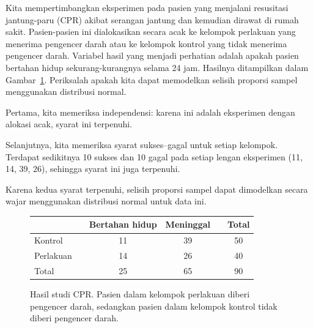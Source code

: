 \begin{examplewrap}
\begin{nexample}{Kita mempertimbangkan eksperimen pada pasien
    yang menjalani resusitasi jantung-paru (CPR)
    akibat serangan jantung dan
    kemudian dirawat di
    rumah sakit.
    Pasien-pasien ini dialokasikan secara acak ke kelompok perlakuan
    yang menerima pengencer darah atau ke kelompok kontrol
    yang tidak menerima pengencer darah.
    Variabel hasil yang menjadi perhatian adalah apakah
    pasien bertahan hidup sekurang-kurangnya selama 24 jam.
    Hasilnya ditampilkan dalam
    Gambar~\ref{resultsForCPRStudyInSmallSampleSection}.
    Periksalah apakah kita dapat memodelkan selisih
    proporsi sampel menggunakan distribusi normal.}

  Pertama, kita memeriksa independensi:
  karena ini adalah eksperimen dengan alokasi acak,
  syarat ini terpenuhi.
  
  Selanjutnya, kita memeriksa syarat sukses--gagal untuk
  setiap kelompok.
  Terdapat sedikitnya 10 sukses dan 10 gagal pada
  setiap lengan eksperimen (11, 14, 39, 26),
  sehingga syarat ini juga terpenuhi.

  Karena kedua syarat terpenuhi,
  selisih proporsi sampel dapat
  dimodelkan secara wajar menggunakan distribusi normal
  untuk data ini.
\end{nexample}
\end{examplewrap}

\begin{figure}[ht]
\centering
\begin{tabular}{lccccc}
\hline
			&& Bertahan hidup 	& Meninggal 	&& Total \\
\hline
Kontrol		&& 11		& 39		&& 50 \\
Perlakuan		&& 14		& 26		&& 40 \\
\hline
Total			&& 25		& 65		&& 90 \\
\hline
\end{tabular}
\caption{Hasil studi CPR.
    Pasien dalam kelompok perlakuan diberi
    pengencer darah, sedangkan pasien dalam kelompok kontrol
    tidak diberi pengencer darah.}
\label{resultsForCPRStudyInSmallSampleSection}
\end{figure}

